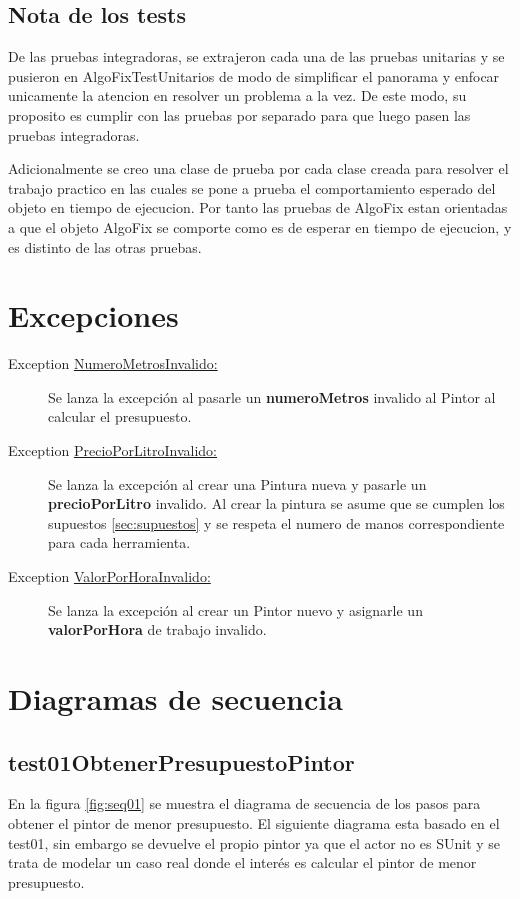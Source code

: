 \documentclass[titlepage,a4paper]{article}
\begin{document}
\subsection{Nota de los tests}
De las pruebas integradoras, se extrajeron cada una de las pruebas unitarias y se pusieron en AlgoFixTestUnitarios 
de modo de simplificar el panorama y enfocar unicamente la atencion en resolver un problema a la vez. 
De este modo, su proposito es cumplir con las pruebas por separado para que luego pasen las pruebas integradoras. \newline

Adicionalmente se creo una clase de prueba por cada clase creada para resolver el trabajo practico
en las cuales se pone a prueba el comportamiento esperado del objeto en tiempo de ejecucion. Por tanto
las pruebas de AlgoFix estan orientadas a que el objeto AlgoFix se comporte como es de esperar en tiempo de ejecucion, 
y es distinto de las otras pruebas.


\section{Excepciones}\label{sec:excepciones}
\begin{description}
\item[Exception \underline{NumeroMetrosInvalido:}] Se lanza la excepción al pasarle un \textbf{numeroMetros} invalido al Pintor al calcular el presupuesto.
\item[Exception \underline{PrecioPorLitroInvalido:}] Se lanza la excepción al crear una Pintura nueva y pasarle un \textbf{precioPorLitro} invalido.
 Al crear la pintura se asume que se cumplen los supuestos \ref{sec:supuestos} y se respeta el numero de manos correspondiente para cada herramienta.
\item[Exception \underline{ValorPorHoraInvalido:}] Se lanza la excepción al crear un Pintor nuevo y asignarle un \textbf{valorPorHora} de trabajo invalido.
\end{description}

\section{Diagramas de secuencia}\label{sec:diagramasdesecuencia}

\subsection{test01ObtenerPresupuestoPintor}
En la figura \ref{fig:seq01} se muestra el diagrama de secuencia de los pasos para obtener el pintor de menor presupuesto.
El siguiente diagrama esta basado en el test01, sin embargo se devuelve el propio pintor ya que el actor no es SUnit y se 
trata de modelar un caso real donde el interés es calcular el pintor de menor presupuesto.
\end{document}
